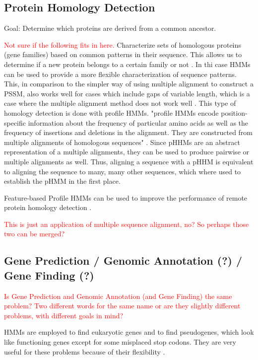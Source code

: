 \documentclass{article}
\begin{document}
\subsection{Protein Homology Detection}
Goal: Determine which proteins are derived from a common ancestor. 

\textcolor{red}{Not sure if the following fits in here.}
Characterize sets of homologous proteins (gene families) based on common patterns in their sequence. This allows us to determine if a new protein belongs to a certain family or not \cite{Christianini2006}. In thi case HMMs can be used to provide a more flexible characterization of sequence patterns. This, in comparison to the simpler way of using multiple alignment to construct a PSSM, also works well for cases which include gaps of variable length, which is a case where the multiple alignment method does not work well \cite{Christianini2006}. This type of homology detection is done with profile HMMs. "proﬁle HMMs encode position-speciﬁc information about
the frequency of particular amino acids as well as the frequency of insertions
and deletions in the alignment. They are constructed from multiple alignments
of homologous sequences" \cite{Christianini2006}. Since pHHMs are an abstract representation of a multiple alignments, they can be used to produce pairwise or multiple alignments as well. Thus, aligning a sequence with a pHHM is equivalent to aligning the sequence to many, many other sequences, which where used to establish the pHMM in the first place. 

Feature-based Profile HMMs can be used to improve the performance of remote protein homology detection \cite{Yoon2009}.

\textcolor{red}{This is just an application of multiple sequence alignment, no? So perhaps those two can be merged?}


\subsection{Gene Prediction / Genomic Annotation (?) / Gene Finding (?)}
\textcolor{red}{Is Gene Prediction and Genomic Annotation (and Gene Finding) the same problem? Two different words for the same name or are they slightly different problems, with different goals in mind?}

HMMs are employed to find eukaryotic genes and to find pseudogenes, which look like functioning genes except for some misplaced stop codons. They are very useful for these problems because of their flexibility \cite{Christianini2006}.
\end{document}
